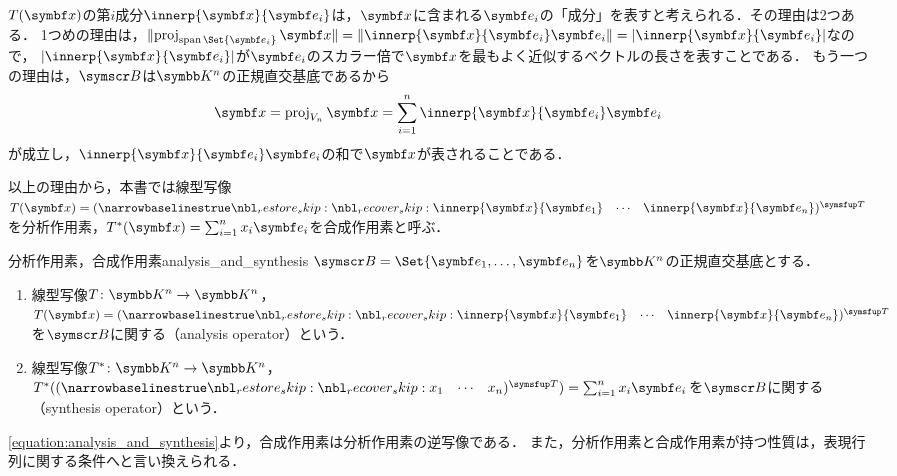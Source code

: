 \documentclass[../../main]{subfiles}
\begin{document}
\(T(\vect{x})\)の第\(i\)成分\(\innerp{\vect{x}}{\vect{e}_i}\)は，\(\vect{x}\)に含まれる\(\vect{e}_i\)の「成分」を表すと考えられる．その理由は2つある．
1つめの理由は，\(\vnorm{\proj_{\spannedby\Set{\vect{e}_i}}\vect{x}}=\vnorm{\innerp{\vect{x}}{\vect{e}_i}\vect{e}_i}=\abs{\innerp{\vect{x}}{\vect{e}_i}}\)なので，
\(\abs{\innerp{\vect{x}}{\vect{e}_i}}\)が\(\vect{e}_i\)のスカラー倍で\(\vect{x}\)を最もよく近似するベクトルの長さを表すことである．
もう一つの理由は，\(\basis{B}\)は\(\numset{K}^n\)の正規直交基底であるから
\begin{equation}
  \label{equation:analysis_and_synthesis}
  \vect{x} = \proj_{V_n}\vect{x}
  = \sum_{i=1}^n\innerp{\vect{x}}{\vect{e}_i}\vect{e}_i
\end{equation}
が成立し，\(\innerp{\vect{x}}{\vect{e}_i}\vect{e}_i\)の和で\(\vect{x}\)が表されることである．

以上の理由から，本書では線型写像\(T(\vect{x})=\trps{\rowvect{\innerp{\vect{x}}{\vect{e}_1} & \cdots & \innerp{\vect{x}}{\vect{e}_n}}}\)を分析作用素，\(\synth{T}(\vect{x})=\sum_{i=1}^nx_i\vect{e}_i\)を合成作用素と呼ぶ．

\begin{definition}{分析作用素，合成作用素}{analysis_and_synthesis}
  \(\basis{B}=\Set{\vect{e}_1,\dots,\vect{e}_n}\)を\(\numset{K}^n\)の正規直交基底とする．
  \begin{enumerate}
    \item 線型写像\(T\colon\numset{K}^n\to\numset{K}^n\)，\(T(\vect{x})=\trps{\rowvect{\innerp{\vect{x}}{\vect{e}_1} & \cdots & \innerp{\vect{x}}{\vect{e}_n}}}\)を\(\basis{B}\)に関する（analysis operator）という．
    \item 線型写像\(\synth{T}\colon\numset{K}^n\to\numset{K}^n\)，\(\synth{T}(\trps{\rowvect{x_1 & \cdots & x_n}})=\sum_{i=1}^nx_i\vect{e}_i\)を\(\basis{B}\)に関する（synthesis operator）という．
  \end{enumerate}
\end{definition}

\cref{equation:analysis_and_synthesis}より，合成作用素は分析作用素の逆写像である．
また，分析作用素と合成作用素が持つ性質は，表現行列に関する条件へと言い換えられる．
\end{document}
